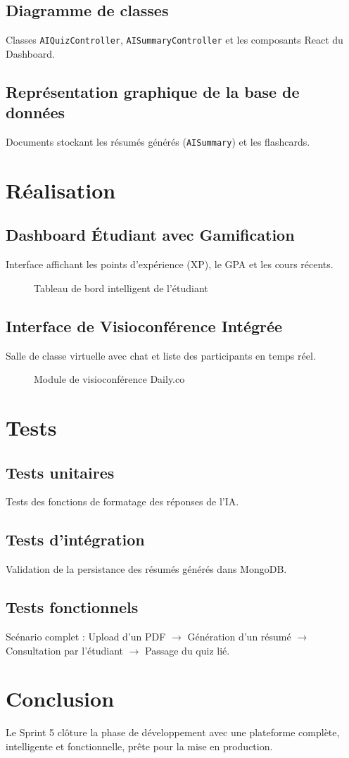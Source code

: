 \subsection{Diagramme de classes}
Classes \texttt{AIQuizController}, \texttt{AISummaryController} et les composants React du Dashboard.

\subsection{Représentation graphique de la base de données}
Documents stockant les résumés générés (\texttt{AISummary}) et les flashcards.

\section{Réalisation}
\subsection{Dashboard Étudiant avec Gamification}
Interface affichant les points d'expérience (XP), le GPA et les cours récents.
\begin{figure}[H]
    \centering
    \caption{Tableau de bord intelligent de l'étudiant}
\end{figure}

\subsection{Interface de Visioconférence Intégrée}
Salle de classe virtuelle avec chat et liste des participants en temps réel.
\begin{figure}[H]
    \centering
    \caption{Module de visioconférence Daily.co}
\end{figure}

\section{Tests}
\subsection{Tests unitaires}
Tests des fonctions de formatage des réponses de l'IA.
\subsection{Tests d'intégration}
Validation de la persistance des résumés générés dans MongoDB.
\subsection{Tests fonctionnels}
Scénario complet : Upload d'un PDF $\rightarrow$ Génération d'un résumé $\rightarrow$ Consultation par l'étudiant $\rightarrow$ Passage du quiz lié.

\section{Conclusion}
Le Sprint 5 clôture la phase de développement avec une plateforme complète, intelligente et fonctionnelle, prête pour la mise en production.
